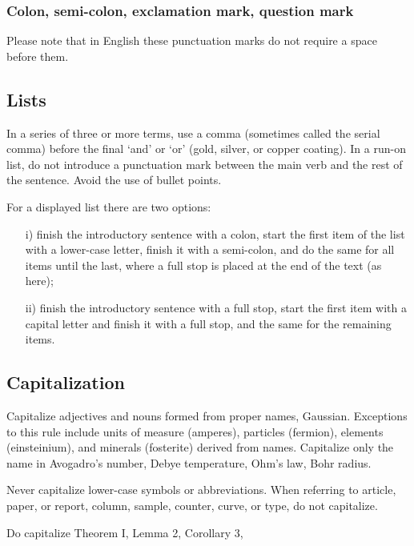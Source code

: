 \documentclass[12pt,twoside,a4paper]{cernrep}
\begin{document}
\subsubsection{Colon, semi-colon, exclamation mark, question mark}

Please note that in English these punctuation marks do not require a
space before them.

\subsection{Lists}

In a series of three or more terms, use a comma (sometimes called the
serial comma) before the final `and' or `or' (\eg gold, silver, or
copper coating). In a run-on list, do not introduce a punctuation mark
between the main verb and the rest of the sentence.  Avoid the use of
bullet points.

For a displayed list there are two options:

\begin{itemize}
\item[i)]  finish the introductory sentence with a colon, start the
           first item of the list with a lower-case letter, finish it
           with a semi-colon, and do the same for all items until the
           last, where a full stop is placed at the end of the text
           (as here);
\item[ii)] finish the introductory sentence with a full stop, start
           the first item with a capital letter and finish it with a
           full stop, and the same for the remaining items.
\end{itemize}

\subsection{Capitalization}

Capitalize adjectives and nouns formed from proper names,
\eg Gaussian.  Exceptions to this rule include units of measure
(amperes), particles (fermion), elements (einsteinium), and minerals
(fosterite) derived from names.  Capitalize only the name in
Avogadro's number, Debye temperature, Ohm's law, Bohr radius.

Never capitalize lower-case symbols or abbreviations. When referring
to article, paper, or report, column, sample, counter, curve, or type,
do not capitalize.

Do capitalize Theorem I, Lemma 2, Corollary 3, \etc
\end{document}

